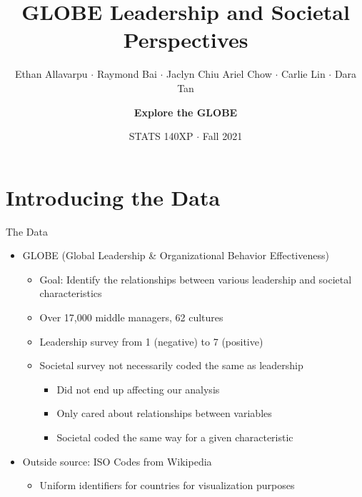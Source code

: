 \documentclass[
  ignorenonframetext,
]{beamer}
\title{GLOBE Leadership and Societal Perspectives}
\subtitle{Ethan Allavarpu \(\cdot\) Raymond Bai \(\cdot\) Jaclyn Chiu
\newline Ariel Chow \(\cdot\) Carlie Lin \(\cdot\) Dara Tan}
\author{\textbf{Explore the GLOBE}}
\date{STATS 140XP \(\cdot\) Fall 2021}
\providecommand{\tightlist}{%
  \setlength{\itemsep}{0pt}\setlength{\parskip}{0pt}}
\begin{document}
\frame{\titlepage}

\hypertarget{introducing-the-data}{%
\section{Introducing the Data}\label{introducing-the-data}}

\begin{frame}{The Data}
\protect\hypertarget{the-data}{}
\begin{itemize}
\tightlist
\item
  GLOBE (Global Leadership \& Organizational Behavior Effectiveness)

  \begin{itemize}
  \tightlist
  \item
    Goal: Identify the relationships between various leadership and
    societal characteristics
  \item
    Over 17,000 middle managers, 62 cultures
  \item
    Leadership survey from 1 (negative) to 7 (positive)
  \item
    Societal survey not necessarily coded the same as leadership

    \begin{itemize}
    \tightlist
    \item
      Did not end up affecting our analysis
    \item
      Only cared about relationships between variables
    \item
      Societal coded the same way for a given characteristic
    \end{itemize}
  \end{itemize}
\item
  Outside source: ISO Codes from Wikipedia

  \begin{itemize}
  \tightlist
  \item
    Uniform identifiers for countries for visualization purposes
  \end{itemize}
\end{itemize}
\end{frame}
\end{document}
